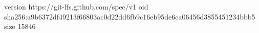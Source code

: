 version https://git-lfs.github.com/spec/v1
oid sha256:a9b6372df49213f66803ac0d22dd6fb9c16eb95de6ca06456d3855451234bbb5
size 15846
